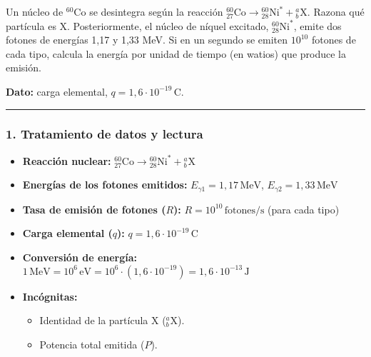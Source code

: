 \begin{cajaenunciado}
Un núcleo de ${}^{60}\text{Co}$ se desintegra según la reacción ${}_{27}^{60}\text{Co}\rightarrow{}_{28}^{60}\text{Ni}^{*}+{}_{b}^{a}\text{X}$. Razona qué partícula es X. Posteriormente, el núcleo de níquel excitado, ${}_{28}^{60}\text{Ni}^{*}$, emite dos fotones de energías 1,17 y 1,33 MeV. Si en un segundo se emiten $10^{10}$ fotones de cada tipo, calcula la energía por unidad de tiempo (en watios) que produce la emisión.

\textbf{Dato:} carga elemental, $q=1,6\cdot10^{-19}\,\text{C}$.
\end{cajaenunciado}
\hrule

\subsubsection*{1. Tratamiento de datos y lectura}
\begin{itemize}
    \item \textbf{Reacción nuclear:} ${}_{27}^{60}\text{Co}\rightarrow{}_{28}^{60}\text{Ni}^{*}+{}_{b}^{a}\text{X}$
    \item \textbf{Energías de los fotones emitidos:} $E_{\gamma1} = 1,17 \, \text{MeV}$, $E_{\gamma2} = 1,33 \, \text{MeV}$
    \item \textbf{Tasa de emisión de fotones ($R$):} $R = 10^{10} \, \text{fotones/s}$ (para cada tipo)
    \item \textbf{Carga elemental ($q$):} $q = 1,6 \cdot 10^{-19} \, \text{C}$
    \item \textbf{Conversión de energía:} $1 \, \text{MeV} = 10^6 \, \text{eV} = 10^6 \cdot (1,6 \cdot 10^{-19}) = 1,6 \cdot 10^{-13} \, \text{J}$
    \item \textbf{Incógnitas:}
    \begin{itemize}
        \item Identidad de la partícula X ($ {}_{b}^{a}\text{X} $).
        \item Potencia total emitida ($P$).
    \end{itemize}
\end{itemize}

